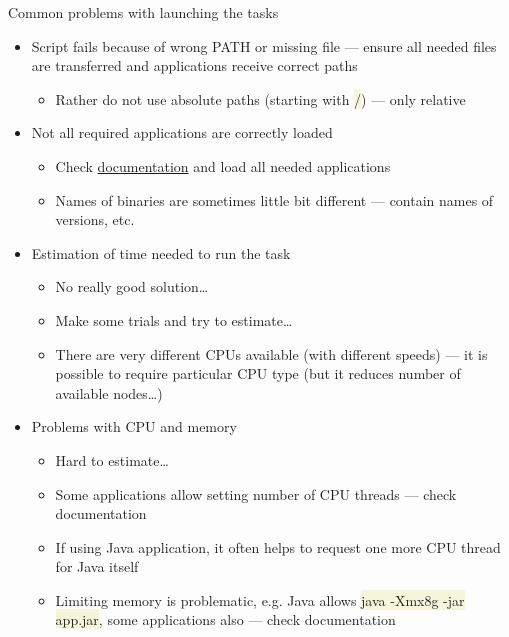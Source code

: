 \documentclass[compress, xelatex, 11pt, xcolor=svgnames, aspectratio=169, url={hyphens, lowtilde}]{beamer}
\renewcommand{\texttt}[1]{\colorbox{Beige}{{\ttfamily #1}}}
\begin{document}
\begin{frame}{Common problems with launching the tasks}
	\begin{itemize}
		\item Script fails because of wrong PATH or missing file --- ensure all needed files are transferred and applications receive correct paths
		\begin{itemize}
			\item Rather do not use absolute paths (starting with \texttt{/}) --- only relative
		\end{itemize}
		\item Not all required applications are correctly loaded
		\begin{itemize}
			\item Check \href{https://docs.metacentrum.cz/}{documentation} and load all needed applications
			\item Names of binaries are sometimes little bit different --- contain names of versions, etc.
		\end{itemize}
		\item Estimation of time needed to run the task
		\begin{itemize}
			\item No really good solution\ldots
			\item Make some trials and try to estimate\ldots
			\item There are very different CPUs available (with different speeds) --- it is possible to require particular CPU type (but it reduces number of available nodes\ldots)
		\end{itemize}
		\item Problems with CPU and memory
		\begin{itemize}
			\item Hard to estimate\ldots
			\item Some applications allow setting number of CPU threads --- check documentation
			\item If using Java application, it often helps to request one more CPU thread for Java itself
			\item Limiting memory is problematic, e.g. Java allows \texttt{java -Xmx8g -jar app.jar}, some applications also --- check documentation
		\end{itemize}
	\end{itemize}
\end{frame}
\end{document}
